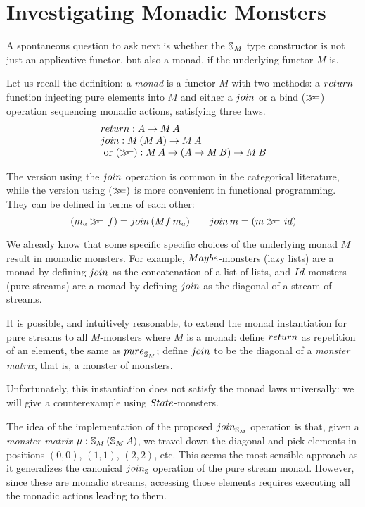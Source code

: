 \section{Investigating Monadic Monsters}\label{sec:monad}

A spontaneous question to ask next is whether the $\mathbb{S}_{M}$ type constructor is not just an applicative functor, but also a monad, if the underlying functor $M$ is.

Let us recall the definition: a {\em monad}
is a functor $M$ with two methods: a $\return$ function injecting pure elements into $M$ and either a $\join$ or a bind ($\mathbin{\gg\!\!=}$) operation sequencing monadic actions, satisfying three laws.
$$
\begin{array}{l}
\return : A \rightarrow M\, A \\
\join : M\,(M\, A) \rightarrow M\, A\\
\mbox{ or }
(\bind) : M\, A \rightarrow (A \rightarrow M\, B) \rightarrow M\, B
\end{array}
$$

The version using the $\join$ operation is common in the categorical literature, while the version using $(\mathbin{\gg\!\!=})$ is more convenient in functional programming.
They can be defined in terms of each other:
$$
(m_a \bind\, f) = \join \, (M f\, m_a) \qquad
\join\, m = (m \bind\,\id)
$$

We already know that some specific specific choices of the underlying monad $M$  result in monadic monsters.
For example, $\maybe$-monsters (lazy lists) are a monad by defining $\join$ as the concatenation of a list of lists, and $\Id$-monsters (pure streams) are a monad by defining $\join$ as the diagonal of a stream of streams.

It is possible, and intuitively reasonable, to extend the monad instantiation for pure streams to all $M$-monsters where $M$ is a monad:
define $\return$ as repetition of an element, the same as $\apure_{\stream{M}}$;
define $\join$ to be the diagonal of a {\em monster matrix}, that is, a monster of monsters.

Unfortunately, this instantiation does not satisfy the monad laws universally: we will give a counterexample using $\state$-monsters.

The idea of the implementation of the proposed $\join_{\stream{M}}$ operation is that,
given a {\em monster matrix} $\mu:\mathbb{S}_{M}\,(\mathbb{S}_{M}\,A)$, we travel down the diagonal and pick elements in positions $(0,0)$, $(1,1)$, $(2,2)$, etc.
This seems the most sensible approach as it generalizes the canonical $\join_\strsym$ operation of the pure stream monad.
However, since these are monadic streams, accessing those elements requires executing all the monadic actions leading to them.

